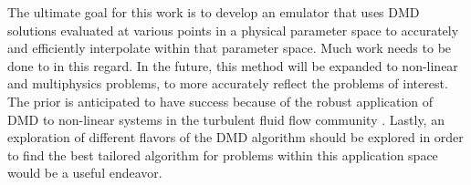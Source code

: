 \documentclass{style/nseJournal}
\begin{document}
The ultimate goal for this work is to develop an emulator that uses DMD solutions evaluated at various points in a physical parameter space to accurately and efficiently interpolate within that parameter space.  
Much work needs to be done to in this regard.  
In the future, this method will be expanded to non-linear and multiphysics problems, to more accurately reflect the problems of interest.  
The prior is anticipated to have success because of the robust application of DMD to non-linear systems in the turbulent fluid flow community \cite{kutz2016dynamic} \cite{schmid2010dynamic}.  
Lastly, an exploration of different flavors of the DMD algorithm should be explored in order to find the best tailored algorithm for problems within this application space would be a useful endeavor.  

\pagebreak

\end{document}
